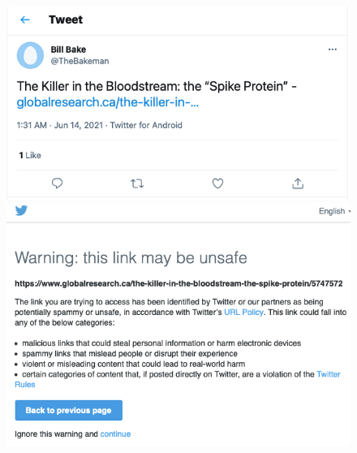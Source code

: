 \documentclass{article}
\begin{document}
\begin{figure}
\centering	
		\includegraphics[scale=0.35]{./img/globalresearch/tweet.png} 
		\includegraphics[scale=0.35]{./img/globalresearch/warning.png}
\caption{}
\label{fig4bis}
\end{figure}



\end{document}
